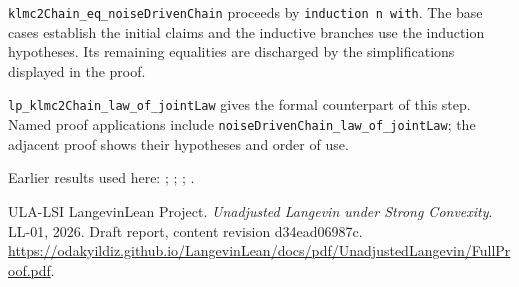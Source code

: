 \documentclass[11pt,a4paper]{article}
\begin{document}
\begin{leanbox}
\texttt{klmc2\allowbreak{}Chain\_\allowbreak{}eq\_\allowbreak{}noise\allowbreak{}Driven\allowbreak{}Chain} proceeds by \texttt{induction n with}. The base cases establish the initial claims and the inductive branches use the induction hypotheses. Its remaining equalities are discharged by the simplifications displayed in the proof.




\texttt{lp\_\allowbreak{}klmc2\allowbreak{}Chain\_\allowbreak{}law\_\allowbreak{}of\_\allowbreak{}joint\allowbreak{}Law} gives the formal counterpart of this step. Named proof applications include \texttt{noise\allowbreak{}Driven\allowbreak{}Chain\_\allowbreak{}law\_\allowbreak{}of\_\allowbreak{}joint\allowbreak{}Law}; the adjacent proof shows their hypotheses and order of use.
\end{leanbox}


Earlier results used here: \cite[Section~3.13.2]{LangevinLean2026ULASC}; \cite[Section~3.20.1]{LangevinLean2026ULASC}; \cite[Section~3.20.3]{LangevinLean2026ULASC}; \cite[Section~3.33.6]{LangevinLean2026ULASC}.

\begin{thebibliography}{ULA-LSI}
LangevinLean Project. \emph{Unadjusted Langevin under Strong Convexity}. LL-01, 2026. Draft report, content revision d34ead06987c. \url{https://odakyildiz.github.io/LangevinLean/docs/pdf/UnadjustedLangevin/FullProof.pdf}.
\end{thebibliography}
\end{document}
